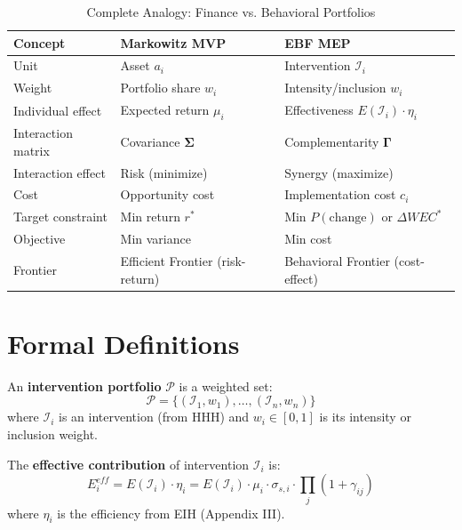 \begin{table}[htbp]
\centering
\caption{Complete Analogy: Finance vs. Behavioral Portfolios}
\label{tab:analogy}
\renewcommand{\arraystretch}{1.4}
\begin{tabular}{@{}lll@{}}
\toprule
\textbf{Concept} & \textbf{Markowitz MVP} & \textbf{EBF MEP} \\
\midrule
Unit & Asset $a_i$ & Intervention $\mathcal{I}_i$ \\
Weight & Portfolio share $w_i$ & Intensity/inclusion $w_i$ \\
Individual effect & Expected return $\mu_i$ & Effectiveness $E(\mathcal{I}_i) \cdot \eta_i$ \\
Interaction matrix & Covariance $\boldsymbol{\Sigma}$ & Complementarity $\boldsymbol{\Gamma}$ \\
Interaction effect & Risk (minimize) & Synergy (maximize) \\
Cost & Opportunity cost & Implementation cost $c_i$ \\
Target constraint & Min return $r^*$ & Min $P(\text{change})$ or $\Delta WEC^*$ \\
Objective & Min variance & Min cost \\
Frontier & Efficient Frontier (risk-return) & Behavioral Frontier (cost-effect) \\
\bottomrule
\end{tabular}
\end{table}


\section{Formal Definitions}
\label{sec:mep-definitions}

\begin{definition}
\label{def:portfolio}
An \textbf{intervention portfolio} $\mathcal{P}$ is a weighted set:
\begin{equation}
\mathcal{P} = \{(\mathcal{I}_1, w_1), \ldots, (\mathcal{I}_n, w_n)\}
\end{equation}
where $\mathcal{I}_i$ is an intervention (from HHH) and $w_i \in [0, 1]$ is its
intensity or inclusion weight.
\end{definition}

\begin{definition}
\label{def:individual-effect}
The \textbf{effective contribution} of intervention $\mathcal{I}_i$ is:
\begin{equation}
E_i^{eff} = E(\mathcal{I}_i) \cdot \eta_i = E(\mathcal{I}_i) \cdot \mu_i \cdot \sigma_{s,i} \cdot \prod_j (1 + \gamma_{ij})
\end{equation}
where $\eta_i$ is the efficiency from EIH (Appendix III).
\end{definition}

